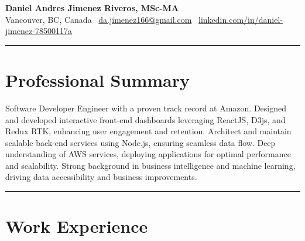 \documentclass[10pt,a4paper]{article}
\begin{document}
\titlespacing*{\section}{0pt}{0pt}{10pt} 
\titlespacing*{\subsection}{0pt}{10pt}{5pt} 

\pagestyle{empty}

{
\centering
{\Huge\textbf{Daniel Andres Jimenez Riveros, MSc-MA}}\\
\medskip 
Vancouver, BC, Canada \textbar\ \href{mailto:da.jimenez166@gmail.com}{da.jimenez166@gmail.com} \textbar\ \href{https://www.linkedin.com/in/daniel-jimenez-78500117a/}{linkedin.com/in/daniel-jimenez-78500117a}\\
}

\rule{\textwidth}{0.4pt} 

\section*{Professional Summary}
Software Developer Engineer with a proven track record at Amazon. Designed and developed interactive front-end dashboards leveraging ReactJS, D3js, and Redux RTK, enhancing user engagement and retention. Architect and maintain scalable back-end services using Node.js, ensuring seamless data flow. Deep understanding of AWS services, deploying applications for optimal performance and scalability. Strong background in business intelligence and machine learning, driving data accessibility and business improvements.

\rule{\textwidth}{0.4pt} 

\section*{Work Experience}
\end{document}
